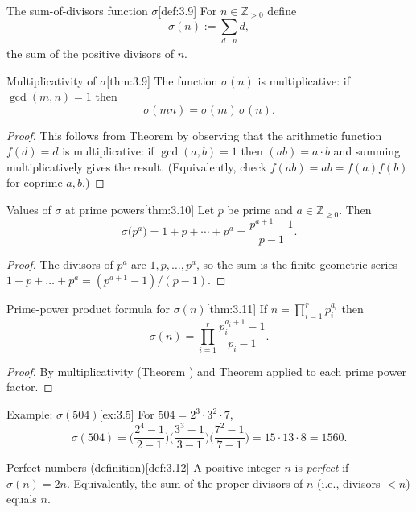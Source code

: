 \documentclass[10pt]{article}
\theoremstyle{definition}
\theoremstyle{plain}
\numberwithin{equation}{section}
\begin{document}
\bigskip

\begin{define}{The sum-of-divisors function $\sigma$}[def:3.9]
For $n\in\mathbb{Z}_{>0}$ define
\[
\sigma(n):=\sum_{d\mid n} d,
\]
the sum of the positive divisors of $n$.
\end{define}

\begin{define}{Multiplicativity of $\sigma$}[thm:3.9]
The function $\sigma(n)$ is multiplicative: if $\gcd(m,n)=1$ then
\[
\sigma(mn)=\sigma(m)\,\sigma(n).
\]
\end{define}

\begin{proof}
This follows from Theorem  by observing that the arithmetic function $f(d)=d$ is multiplicative: if $\gcd(a,b)=1$ then $(ab)=a\cdot b$ and summing multiplicatively gives the result. (Equivalently, check $f(ab)=ab=f(a)f(b)$ for coprime $a,b$.)
\end{proof}

\begin{define}{Values of $\sigma$ at prime powers}[thm:3.10]
Let $p$ be prime and $a\in\mathbb{Z}_{\ge0}$. Then
\[
\sigma\big(p^{a}\big)=1+p+\cdots+p^{a}=\frac{p^{a+1}-1}{p-1}.
\]
\end{define}

\begin{proof}
The divisors of $p^a$ are $1,p,\dots,p^a$, so the sum is the finite geometric series $1+p+\dots+p^a=(p^{a+1}-1)/(p-1)$.
\end{proof}

\begin{define}{Prime-power product formula for $\sigma(n)$}[thm:3.11]
If $n=\prod_{i=1}^r p_i^{a_i}$ then
\[
\sigma(n)=\prod_{i=1}^r \frac{p_i^{a_i+1}-1}{p_i-1}.
\]
\end{define}

\begin{proof}
By multiplicativity (Theorem ) and Theorem  applied to each prime power factor.
\end{proof}

\begin{define}{Example: $\sigma(504)$}[ex:3.5]
For $504=2^3\cdot 3^2\cdot 7$,
\[
\sigma(504)=\Big(\frac{2^{4}-1}{2-1}\Big)\Big(\frac{3^{3}-1}{3-1}\Big)\Big(\frac{7^{2}-1}{7-1}\Big)
=15\cdot 13\cdot 8 =1560.
\]
\end{define}

\bigskip

\begin{define}{Perfect numbers (definition)}[def:3.12]
A positive integer $n$ is \emph{perfect} if $\sigma(n)=2n$. Equivalently, the sum of the proper divisors of $n$ (i.e., divisors $<n$) equals $n$.
\end{define}
\end{document}
